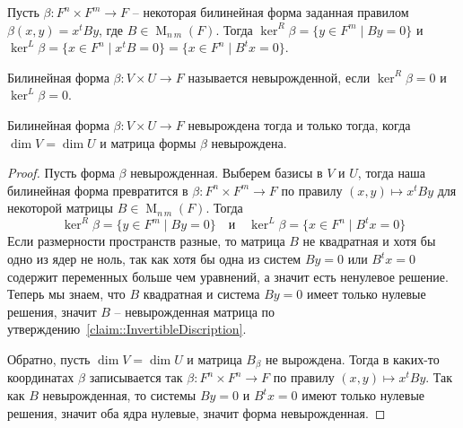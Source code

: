 Пусть $\beta\colon F^n\times F^m \to F$ -- некоторая билинейная форма заданная правилом $\beta(x,y) = x^t By$, где $B\in \operatorname{M}_{n\,m}(F)$.
Тогда
$\ker^R \beta = \{y\in F^m\mid By = 0\}$ и $\ker^L\beta = \{x\in F^n \mid x^t B = 0\} = \{x\in F^n \mid B^t x = 0\}$.

\begin{definition}
Билинейная форма $\beta\colon V\times U\to F$ называется невырожденной, если $\ker^R\beta = 0$ и $\ker^L\beta = 0$.
\end{definition}


\begin{claim}
Билинейная форма $\beta\colon V\times U\to F$ невырождена тогда и только тогда, когда $\dim V = \dim U$ и матрица формы $\beta$ невырождена.
\end{claim}
\begin{proof}
Пусть форма $\beta$ невырожденная.
Выберем базисы в $V$ и $U$, тогда наша билинейная форма превратится в $\beta\colon F^n \times F^m\to F$ по правилу $(x,y)\mapsto x^t B y$ для некоторой матрицы $B\in \operatorname{M}_{n\,m}(F)$.
Тогда
\[
\ker^R \beta = \{y\in F^m\mid By = 0\}\quad\text{и}\quad \ker^L\beta = \{x\in F^n \mid B^t x = 0\}
\]
Если размерности пространств разные, то матрица $B$ не квадратная и хотя бы одно из ядер не ноль, так как хотя бы одна из систем $B y = 0$ или $B^t x = 0$ содержит переменных больше чем уравнений, а значит есть ненулевое решение.
Теперь мы знаем, что $B$ квадратная и система $By = 0$ имеет только нулевые решения, значит $B$ -- невырожденная матрица по утверждению~\ref{claim::InvertibleDiscription}.

Обратно, пусть $\dim V = \dim U$ и матрица $B_\beta$ не вырождена.
Тогда в каких-то координатах $\beta$ записывается так $\beta\colon F^n \times F^n \to F$ по правилу $(x,y)\mapsto x^t By$.
Так как $B$ невырожденная, то системы $B y = 0$ и $B^t x = 0$ имеют только нулевые решения, значит оба ядра нулевые, значит форма невырожденная.
\end{proof}

